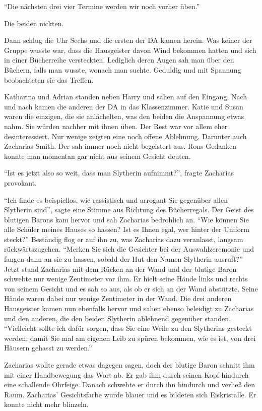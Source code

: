 \enquote{Die nächsten drei vier Termine werden wir noch vorher üben.}

Die beiden nickten.

Dann schlug die Uhr Sechs und die ersten der DA kamen herein. Was keiner der Gruppe wusste war, dass die Hausgeister davon Wind bekommen hatten und sich in einer Bücherreihe versteckten. Lediglich deren Augen sah man über den Büchern, falls man wusste, wonach man suchte. Geduldig und mit Spannung beobachteten sie das Treffen.

Katharina und Adrian standen neben Harry und sahen auf den Eingang. Nach und nach kamen die anderen der DA in das Klassenzimmer. Katie und Susan waren die einzigen, die sie anlächelten, was den beiden die Anspannung etwas nahm. Sie würden nachher mit ihnen üben. Der Rest war vor allem eher desinteressiert. Nur wenige zeigten eine noch offene Ablehnung. Darunter auch Zacharias Smith. Der sah immer noch nicht begeistert aus. Rons Gedanken konnte man momentan gar nicht aus seinem Gesicht deuten.

\enquote{Ist es jetzt also so weit, dass man Slytherin aufnimmt?}, fragte Zacharias provokant.

\enquote{Ich finde es beispiellos, wie rassistisch und arrogant Sie gegenüber allen Slytherin sind}, sagte eine Stimme aus Richtung des Bücherregals. Der Geist des blutigen Barons kam hervor und sah Zacharias bedrohlich an. \enquote{Wie können Sie alle Schüler meines Hauses so hassen? Ist es Ihnen egal, wer hinter der Uniform steckt?} Beständig flog er auf ihn zu, was Zacharias dazu veranlasst, langsam rückwärtszugehen. \enquote{Merken Sie sich die Gesichter bei der Auswahlzeremonie und fangen dann an sie zu hassen, sobald der Hut den Namen Slytherin ausruft?} Jetzt stand Zacharias mit dem Rücken an der Wand und der blutige Baron schwebte nur wenige Zentimeter vor ihm. Er hielt seine Hände links und rechts von seinem Gesicht und es sah so aus, als ob er sich an der Wand abstützte. Seine Hände waren dabei nur wenige Zentimeter in der Wand. Die drei anderen Hausgeister kamen nun ebenfalls hervor und sahen ebenso beleidigt zu Zacharias und den anderen, die den beiden Slytherin ablehnend gegenüber standen. \enquote{Vielleicht sollte ich dafür sorgen, dass Sie eine Weile zu den Slytherins gesteckt werden, damit Sie mal am eigenen Leib zu spüren bekommen, wie es ist, von drei Häusern gehasst zu werden.}

Zacharias wollte gerade etwas dagegen sagen, doch der blutige Baron schnitt ihm mit einer Handbewegung das Wort ab. Er gab ihm durch seinen Kopf hindurch eine schallende Ohrfeige. Danach schwebte er durch ihn hindurch und verließ den Raum. Zacharias’ Gesichtsfarbe wurde blauer und es bildeten sich Eiskristalle. Er konnte nicht mehr blinzeln.

